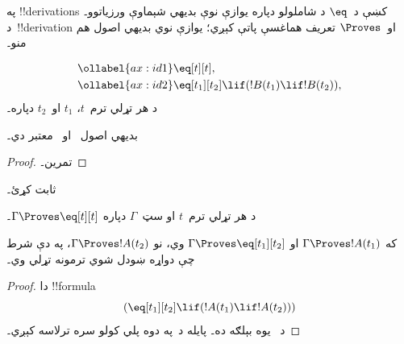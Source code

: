 \documentclass[../../../include/open-logic-section]{subfiles}
\begin{document}


په !!{derivation}s کښې د~$\eq$ د شاملولو دپاره يوازې نوې بديهي
شېماوې ورزياتوو۔ د~!!{derivation} او~$\Proves$ تعريف هماغسې پاتې
کېږي؛ يوازې نوي بديهي اصول هم منو۔

\begin{defn}
\begin{align}
\ollabel{ax:id1} & \eq[t][t], \\
\ollabel{ax:id2} & \eq[t_1][t_2] \lif (!B(t_1) \lif
  !B(t_2)),
\end{align}
د هر تړلي ترم~$t$، $t_1$ او~$t_2$ دپاره۔
\end{defn}

\begin{prop}
  بديهي اصول~ او~ معتبر دي۔
\end{prop}

\begin{proof}
  تمرين۔
\end{proof}

\begin{prob}
 ثابت کړئ۔
\end{prob}

\begin{prop}
 د هر تړلي ترم~$t$ او سټ~$\Gamma$ دپاره
 $\Gamma \Proves \eq[t][t]$۔
\end{prop}

\begin{prop}
  که $\Gamma \Proves !A(t_1)$ او $\Gamma \Proves
  \eq[t_1][t_2]$ وي، نو $\Gamma \Proves !A(t_2)$، په دې شرط چې
  دواړه ښودل شوي ترمونه تړلي وي۔
\end{prop}

\begin{proof}
دا !!{formula}
\[
(\eq[t_1][t_2] \lif (!A(t_1) \lif !A(t_2)))
\]
د~ يوه بېلګه ده۔ پايله د~\MP په دوه پلي کولو سره
ترلاسه کېږي۔
\end{proof}
\end{document}

